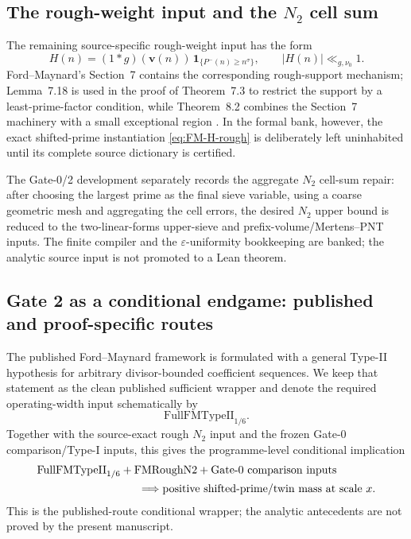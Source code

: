 \documentclass[11pt]{article}
\theoremstyle{definition}
\newcommand{\1}{\mathbf 1}
\begin{document}
\subsection{The rough-weight input and the \texorpdfstring{$N_2$}{N2} cell sum}
The remaining source-specific rough-weight input has the form
\begin{equation}
 H(n)=(1*g)(\mathbf v(n))\,
       \mathbf 1_{\{P^-(n)\ge n^\sigma\}},
 \qquad |H(n)|\ll_{g,\nu_0}1.
 \label{eq:FM-H-rough}
\end{equation}
Ford--Maynard's Section~7 contains the corresponding rough-support mechanism;
Lemma~7.18 is used in the proof of Theorem~7.3 to restrict the support by a
least-prime-factor condition, while Theorem~8.2 combines the Section~7
machinery with a small exceptional region \cite{FordMaynard2024}.  In the
formal bank, however, the exact shifted-prime instantiation
\eqref{eq:FM-H-rough} is deliberately left uninhabited until its complete
source dictionary is certified.

The Gate-0/2 development separately records the aggregate $N_2$ cell-sum
repair: after choosing the largest prime as the final sieve variable, using a
coarse geometric mesh and aggregating the cell errors, the desired $N_2$
upper bound is reduced to the two-linear-forms upper-sieve and
prefix-volume/Mertens--PNT inputs.  The finite compiler and the
$\varepsilon$-uniformity bookkeeping are banked; the analytic source input is
not promoted to a Lean theorem.

\subsection{Gate 2 as a conditional endgame: published and proof-specific routes}
The published Ford--Maynard framework is formulated with a general Type-II
hypothesis for arbitrary divisor-bounded coefficient sequences.  We keep that
statement as the clean published sufficient wrapper and denote the required
operating-width input schematically by
\[
   \mathrm{FullFMTypeII}_{1/6}.
\]
Together with the source-exact rough $N_2$ input and the frozen Gate-0
comparison/Type-I inputs, this gives the programme-level conditional implication
\begin{equation}
\begin{aligned}
 &\mathrm{FullFMTypeII}_{1/6}
 +\mathrm{FMRoughN2}
 +\text{Gate-0 comparison inputs}\\
 &\hspace{32mm}\Longrightarrow
 \text{positive shifted-prime/twin mass at scale }x.
\end{aligned}
\label{eq:gate2-published-route}
\end{equation}
This is the published-route conditional wrapper; the analytic antecedents are
not proved by the present manuscript.
\end{document}
